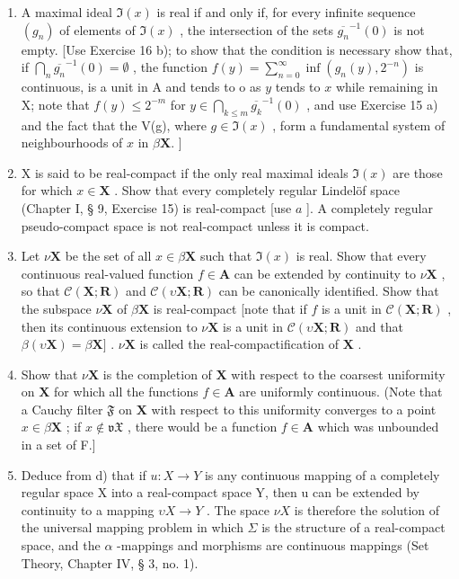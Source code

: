 \begin{enumerate}
\def\labelenumi{\alph{enumi})}
\item
  A maximal ideal \(\Im(x)\) is real if and only if, for every infinite sequence \((g_n)\) of elements of \(\Im(x)\) , the intersection of the sets \(\overline{g_n}^{-1}(0)\) is not empty. {[}Use Exercise 16 b); to show that the condition is necessary show that, if \(\bigcap_{n}\overline{g_{n}}^{-1}(0) = \emptyset\) , the function \(f(y) = \sum_{n = 0}^{\infty}\inf (g_n(y),2^{-n})\) is continuous, is a unit in A and tends to o as \(y\) tends to \(x\) while remaining in X; note that \(f(y)\leqslant 2^{-m}\) for \(y\in \bigcap_{k\leqslant m}\overline{g_k}^{-1}(0)\) , and use Exercise 15 a) and the fact that the V(g), where \(g\in \Im(x)\) , form a fundamental system of neighbourhoods of \(x\) in \(\beta \mathbf{X}.\) {]}
\item
  X is said to be real-compact if the only real maximal ideals \(\Im(x)\) are those for which \(x \in \mathbf{X}\) . Show that every completely regular Lindelöf space (Chapter I, § 9, Exercise 15) is real-compact {[}use \(a\) {]}. A completely regular pseudo-compact space is not real-compact unless it is compact.
\item
  Let \(\nu\mathbf{X}\) be the set of all \(x\in \beta \mathbf{X}\) such that \(\Im (x)\) is real. Show that every continuous real-valued function \(f\in \mathbf{A}\) can be extended by continuity to \(\nu\mathbf{X}\) , so that \(\mathcal{C}(\mathbf{X};\mathbf{R})\) and \(\mathcal{C}(\upsilon\mathbf{X};\mathbf{R})\) can be canonically identified. Show that the subspace \(\nu\mathbf{X}\) of \(\beta\mathbf{X}\) is real-compact {[}note that if \(f\) is a unit in \(\mathcal{C}(\mathbf{X};\mathbf{R})\) , then its continuous extension to \(\nu\mathbf{X}\) is a unit in \(\mathcal{C}(\upsilon\mathbf{X};\mathbf{R})\) and that \(\beta(\upsilon\mathbf{X}) = \beta\mathbf{X}]\) . \(\nu\mathbf{X}\) is called the real-compactification of \(\mathbf{X}\) .
\item
  Show that \(\nu\mathbf{X}\) is the completion of \(\mathbf{X}\) with respect to the coarsest uniformity on \(\mathbf{X}\) for which all the functions \(f\in \mathbf{A}\) are uniformly continuous. (Note that a Cauchy filter \(\mathfrak{F}\) on \(\mathbf{X}\) with respect to this uniformity converges to a point \(x\in \beta \mathbf{X}\) ; if \(x\notin \mathfrak{vX}\) , there would be a function \(f\in \mathbf{A}\) which was unbounded in a set of F.{]}
\item
  Deduce from d) that if \(u: X \to Y\) is any continuous mapping of a completely regular space X into a real-compact space Y, then u can be extended by continuity to a mapping \(\upsilon X \to Y\) . The space \(\nu X\) is therefore the solution of the universal mapping problem in which \(\Sigma\) is the structure of a real-compact space, and the \(\alpha\) -mappings and morphisms are continuous mappings (Set Theory, Chapter IV, § 3, no. 1).
\end{enumerate}

